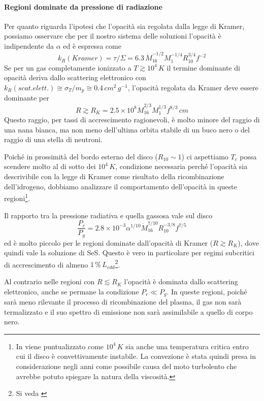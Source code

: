 \documentclass[a4paperbi]{article}
\begin{document}
	\paragraph{Regioni dominate da pressione di radiazione}
	Per quanto riguarda l'ipotesi che l'opacità sia regolata dalla legge di Kramer, possiamo osservare che per il nostro sistema delle soluzioni l'opacità è indipendente da $\alpha$ ed è espressa come
	\begin{equation}
		k_R(Kramer)=\tau/\Sigma=6.3\,\dot{M}^{-1/2}_{16}M^{-1/4}_1R^{3/4}_{10}f^{-2}
	\end{equation}
	Se per un gas completamente ionizzato a $T\gtrsim10^4\,K$ il termine dominante di opacità deriva dallo scattering elettronico con \\$k_R(scat. elett.)\cong\sigma_T/m_p\cong0.4\,cm^2\,g^{-1}$, l'opacità regolata da Kramer deve essere dominante per	
	\begin{equation}
		R\gtrsim R_K=2.5\times10^8\dot{M}^{2/3}_{16}M^{1/3}_1f^{8/3}\,cm
	\end{equation}
	Questo raggio, per tassi di accrescimento ragionevoli, è molto minore del raggio di una nana bianca, ma non meno dell'ultima orbita stabile di un buco nero o del raggio di una stella di neutroni.
	
	Poiché in prossimità del bordo esterno del disco ($R_{10}\sim1$) ci aspettiamo $T_c$ possa scendere molto al di sotto dei $10^4\,K$, condizione necessaria perché l'opacità sia descrivibile con la legge di Kramer come risultato della ricombinazione dell'idrogeno, dobbiamo analizzare il comportamento dell'opacità in queste regioni\footnote{In \cite{Pringle1981} viene puntualizzato come $10^4\,K$ sia anche una temperatura critica entro cui il disco è convettivamente instabile. La convezione è stata quindi presa in considerazione negli anni come possibile causa del moto turbolento che avrebbe potuto spiegare la natura della viscosità.}.
	
	Il rapporto tra la pressione radiativa e quella gassosa vale sul disco
	\begin{equation}
		\frac{P_r}{P_g}=2.8\times10^{-3}\alpha^{1/10}\dot{M}^{7/10}_{16}R^{-3/8}_{10}f^{7/5}
	\end{equation}
ed è molto piccolo per le regioni dominate dall'opacità di Kramer ($R\gtrsim R_K$), dove quindi vale la soluzione di SeS. Questo è vero in particolare per regimi subcritici di accrescimento di almeno $1\,\%\,L_{edd}$\footnote{Si veda \cite{ShakuraSunyaev1973}}.
	
	Al contrario nelle regioni con $R\lesssim R_K$ l'opacità è dominata dallo scattering elettronico, anche se permane la condizione $P_r\ll P_g$. In queste regioni, poiché sarà meno rilevante il processo di ricombinazione del plasma, il gas non sarà termalizzato e il suo spettro di emissione non sarà assimilabile a quello di corpo nero.
\end{document}
